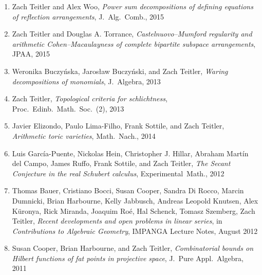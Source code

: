 \documentclass[12pt]{article}
\begin{document}
\begin{enumerate}
\item Zach Teitler and Alex Woo,
\emph{Power sum decompositions of defining equations of reflection arrangements},
J.~Alg.\ Comb.,
2015

\item Zach Teitler and Douglas A. Torrance,
\emph{Castelnuovo--Mumford regularity and arithmetic Cohen--Macaulayness of complete bipartite subspace arrangements},
JPAA,
2015

\item Weronika Buczy\'nska, Jaros{\l}aw Buczy\'nski, and Zach Teitler,
\emph{Waring decompositions of monomials},
J.\ Algebra,
2013

\item Zach Teitler,
\emph{Topological criteria for schlichtness},
Proc.\ Edinb.\ Math.\ Soc.\ (2),
2013

\item Javier Elizondo, Paulo Lima-Filho, Frank Sottile, and Zach Teitler,
\emph{Arithmetic toric varieties},
Math.\ Nach.,
2014

\item Luis Garc\'ia-Puente, Nickolas Hein, Christopher J. Hillar, Abraham Mart\'in del Campo, James Ruffo, Frank Sottile, and Zach Teitler,
\emph{The Secant Conjecture in the real Schubert calculus},
Experimental~Math.,
2012

\item
Thomas Bauer, Cristiano Bocci, Susan Cooper, Sandra Di Rocco, Marcin Dumnicki, Brian Harbourne, Kelly Jabbusch, Andreas Leopold Knutsen, Alex K\"uronya,
Rick Miranda, Joaquim Ro\'e, Hal Schenck, Tomasz Szemberg, Zach Teitler,
\emph{Recent developments and open problems in linear series},
in \textit{Contributions to Algebraic Geometry}, IMPANGA Lecture Notes, August 2012

\item Susan Cooper, Brian Harbourne, and Zach Teitler,
\emph{Combinatorial bounds on Hilbert functions of fat points in projective space},
J.\ Pure Appl.\ Algebra,
2011


\end{enumerate}
\end{document}

